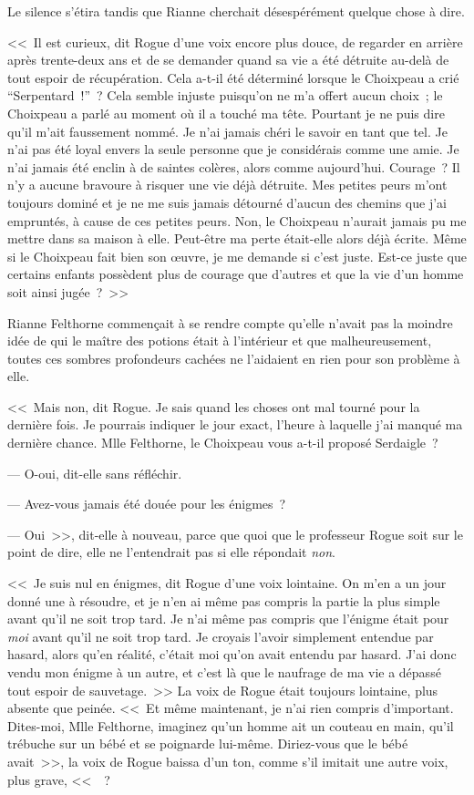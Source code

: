 Le silence s'étira tandis que Rianne cherchait désespérément quelque chose à dire.

<<~Il est curieux, dit Rogue d'une voix encore plus douce, de regarder en arrière après trente-deux ans et de se demander quand sa vie a été détruite au-delà de tout espoir de récupération. Cela a-t-il été déterminé lorsque le Choixpeau a crié “Serpentard~!”~? Cela semble injuste puisqu'on ne m'a offert aucun choix~; le Choixpeau a parlé au moment où il a touché ma tête. Pourtant je ne puis dire qu'il m'ait faussement nommé. Je n'ai jamais chéri le savoir en tant que tel. Je n'ai pas été loyal envers la seule personne que je considérais comme une amie. Je n'ai jamais été enclin à de saintes colères, alors comme aujourd'hui. Courage~? Il n'y a aucune bravoure à risquer une vie déjà détruite. Mes petites peurs m'ont toujours dominé et je ne me suis jamais détourné d'aucun des chemins que j'ai empruntés, à cause de ces petites peurs. Non, le Choixpeau n'aurait jamais pu me mettre dans sa maison à elle. Peut-être ma perte était-elle alors déjà écrite. Même si le Choixpeau fait bien son œuvre, je me demande si c'est juste. Est-ce juste que certains enfants possèdent plus de courage que d'autres et que la vie d'un homme soit ainsi jugée~?~>>

Rianne Felthorne commençait à se rendre compte qu'elle n'avait pas la moindre idée de qui le maître des potions était à l'intérieur et que malheureusement, toutes ces sombres profondeurs cachées ne l'aidaient en rien pour son problème à elle.

<<~Mais non, dit Rogue. Je sais quand les choses ont mal tourné pour la dernière fois. Je pourrais indiquer le jour exact, l'heure à laquelle j'ai manqué ma dernière chance. Mlle Felthorne, le Choixpeau vous a-t-il proposé Serdaigle~?

--- O-oui, dit-elle sans réfléchir.

--- Avez-vous jamais été douée pour les énigmes~?

--- Oui~>>, dit-elle à nouveau, parce que quoi que le professeur Rogue soit sur le point de dire, elle ne l'entendrait pas si elle répondait \emph{non}.

<<~Je suis nul en énigmes, dit Rogue d'une voix lointaine. On m'en a un jour donné une à résoudre, et je n'en ai même pas compris la partie la plus simple avant qu'il ne soit trop tard. Je n'ai même pas compris que l'énigme était pour \emph{moi} avant qu'il ne soit trop tard. Je croyais l'avoir simplement entendue par hasard, alors qu'en réalité, c'était moi qu'on avait entendu par hasard. J'ai donc vendu mon énigme à un autre, et c'est là que le naufrage de ma vie a dépassé tout espoir de sauvetage.~>> La voix de Rogue était toujours lointaine, plus absente que peinée. <<~Et même maintenant, je n'ai rien compris d'important. Dites-moi, Mlle Felthorne, imaginez qu'un homme ait un couteau en main, qu'il trébuche sur un bébé et se poignarde lui-même. Diriez-vous que le bébé avait~>>, la voix de Rogue baissa d'un ton, comme s'il imitait une autre voix, plus grave, <<~~?

